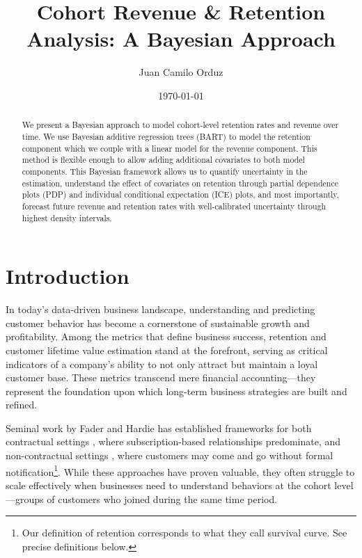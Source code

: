 \documentclass[11pt]{amsart}
\theoremstyle{definition}
\begin{document}
\title{Cohort Revenue \& Retention Analysis: A Bayesian Approach}
\author{Juan Camilo Orduz}
\address{Berlin, Germany}
\date{\today}

\begin{abstract}
    We present a Bayesian approach to model cohort-level retention rates and revenue over time. We use Bayesian additive
    regression trees (BART) to model the retention component which we couple with a linear model for the revenue component.
    This method is flexible enough to allow adding additional covariates to both model components. This Bayesian framework
    allows us to quantify uncertainty in the estimation, understand the effect of covariates on retention through partial
    dependence plots (PDP) and individual conditional expectation (ICE) plots, and most importantly, forecast future
    revenue and retention rates with well-calibrated uncertainty through highest density intervals.
\end{abstract}

\maketitle

\tableofcontents
{}

\section{Introduction}

In today's data-driven business landscape, understanding and predicting customer behavior has become a cornerstone of
sustainable growth and profitability. Among the metrics that define business success, retention and customer lifetime value
estimation stand at the forefront, serving as critical indicators of a company's ability to not only attract but maintain a
loyal customer base. These metrics transcend mere financial accounting—they represent the foundation upon which long-term
business strategies are built and refined.

Seminal work by Fader and Hardie has established frameworks for both contractual settings \cite{FaderHardie2007}, where
subscription-based relationships predominate, and non-contractual settings \cite{FaderHardie2005}, where customers may come
and go without formal notification\footnote{Our definition of retention corresponds to what they call survival curve. See
    precise definitions below.}. While these approaches have proven valuable, they often struggle to scale effectively when
businesses need to understand behaviors at the cohort level—groups of customers who joined during the same time period.
\end{document}
